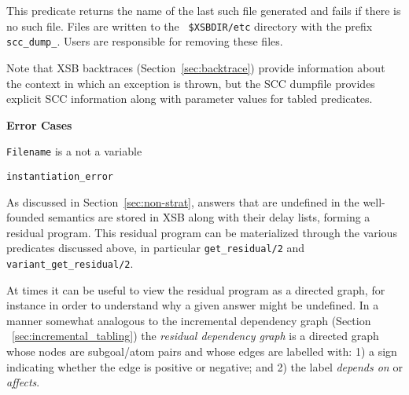 \begin{description}
This predicate returns the name of the last such file generated and
fails if there is no such file.  Files are written to the {\tt
  \$XSBDIR/etc} directory with the prefix {\tt scc\_dump\_}.  Users
are responsible for removing these files.

Note that XSB backtraces (Section~\ref{sec:backtrace}) provide
information about the context in which an exception is thrown, but the
SCC dumpfile provides explicit SCC information along with parameter
values for tabled predicates.

{\bf Error Cases}
\bi
\item {\tt Filename} is a not a variable
\bi
\item {\tt instantiation\_error}
\ei
\ei

%
As discussed in Section~\ref{sec:non-strat}, answers that are
undefined in the well-founded semantics are stored in XSB along with
their delay lists, forming a residual program.  This residual program
can be materialized through the various predicates discussed above, in
particular {\tt get\_residual/2} and {\tt variant\_get\_residual/2}.

At times it can be useful to view the residual program as a directed
graph, for instance in order to understand why a given answer might be
undefined.  In a manner somewhat analogous to the incremental
dependency graph (Section ~\ref{sec:incremental_tabling}) the {\em
  residual dependency graph} is a directed graph whose nodes are
subgoal/atom pairs and whose edges are labelled with: 1) a sign
indicating whether the edge is positive or negative; and 2) the label
{\em depends on} or {\em affects}.


\end{description}
